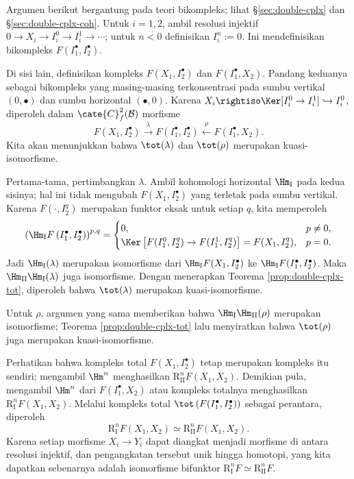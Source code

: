 \begin{bukti}
Argumen berikut bergantung pada teori bikompleks; lihat
\S\ref{sec:double-cplx} dan \S\ref{sec:double-cplx-coh}. Untuk $i=1,2$,
ambil resolusi injektif $0\to X_i\to I_i^0\to I_i^1\to\cdots$; untuk
$n<0$ definisikan $I_i^n:=0$. Ini mendefinisikan bikompleks
$F\left(I_1^\bullet,I_2^\bullet\right)$.

Di sisi lain, definisikan kompleks $F(X_1,I_2^\bullet)$ dan
$F(I_1^\bullet,X_2)$. Pandang keduanya sebagai bikompleks yang masing-masing
terkonsentrasi pada sumbu vertikal $(0,\bullet)$ dan sumbu horizontal
$(\bullet,0)$. Karena
$X_i\rightiso\Ker[I_i^0\to I_i^1]\hookrightarrow I_i^0$, diperoleh dalam
$\cate{C}^2_f(\mathcal{B})$ morfisme
\[
F(X_1,I_2^\bullet)\xrightarrow{\lambda}
F\left(I_1^\bullet,I_2^\bullet\right)\xleftarrow{\rho}
F(I_1^\bullet,X_2).
\]
Kita akan menunjukkan bahwa $\tot(\lambda)$ dan $\tot(\rho)$ merupakan
kuasi-isomorfisme.

Pertama-tama, pertimbangkan $\lambda$. Ambil kohomologi horizontal
$\Hm_{\mathrm{I}}$ pada kedua sisinya; hal ini tidak mengubah
$F(X_1,I_2^\bullet)$ yang terletak pada sumbu vertikal. Karena
$F(\cdot,I_2^q)$ merupakan funktor eksak untuk setiap $q$, kita memperoleh
\[
\left(\Hm_{\mathrm{I}}F\left(I_1^\bullet,I_2^\bullet\right)\right)^{p,q}
=\begin{cases}
0,&p\neq0,\\
\Ker\left[F(I_1^0,I_2^q)\to F(I_1^1,I_2^q)\right]
=F(X_1,I_2^q),&p=0.
\end{cases}
\]
Jadi $\Hm_{\mathrm{I}}(\lambda)$ merupakan isomorfisme dari
$\Hm_{\mathrm{I}}F(X_1,I_2^\bullet)$ ke
$\Hm_{\mathrm{I}}F(I_1^\bullet,I_2^\bullet)$. Maka
$\Hm_{\mathrm{II}}\Hm_{\mathrm{I}}(\lambda)$ juga isomorfisme. Dengan
menerapkan Teorema \ref{prop:double-cplx-tot}, diperoleh bahwa
$\tot(\lambda)$ merupakan kuasi-isomorfisme.

Untuk $\rho$, argumen yang sama memberikan bahwa
$\Hm_{\mathrm{I}}\Hm_{\mathrm{II}}(\rho)$ merupakan isomorfisme; Teorema
\ref{prop:double-cplx-tot} lalu menyiratkan bahwa $\tot(\rho)$ juga merupakan
kuasi-isomorfisme.

Perhatikan bahwa kompleks total $F(X_1,I_2^\bullet)$ tetap merupakan
kompleks itu sendiri; mengambil $\Hm^n$ menghasilkan
$\mathrm{R}_{\mathrm{II}}^nF(X_1,X_2)$. Demikian pula, mengambil $\Hm^n$ dari
$F(I_1^\bullet,X_2)$ atau kompleks totalnya menghasilkan
$\mathrm{R}_{\mathrm{I}}^nF(X_1,X_2)$. Melalui kompleks total
$\tot\left(F(I_1^\bullet,I_2^\bullet)\right)$ sebagai perantara, diperoleh
\[
\mathrm{R}_{\mathrm{I}}^nF(X_1,X_2)\simeq
\mathrm{R}_{\mathrm{II}}^nF(X_1,X_2).
\]
Karena setiap morfisme $X_i\to Y_i$ dapat diangkat menjadi morfisme di antara
resolusi injektif, dan pengangkatan tersebut unik hingga homotopi, yang kita
dapatkan sebenarnya adalah isomorfisme bifunktor
$\mathrm{R}_{\mathrm{I}}^nF\simeq\mathrm{R}_{\mathrm{II}}^nF$.
\end{bukti}

